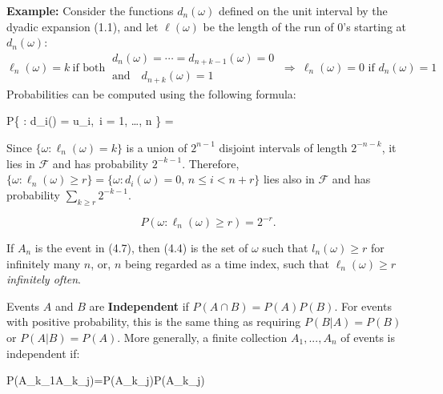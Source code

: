 \textbf{Example:} Consider the functions \( d_n(\omega) \) defined on the unit interval by the dyadic expansion (1.1), and let \( \boldsymbol{\ell}(\omega) \) be the length of the run of 0's starting at \( d_n(\omega) \):  
\[
\boldsymbol{\ell}_n(\omega) = k \ \text{if both} \ 
\begin{array}{l}
    d_n(\omega) = \cdots = d_{n+k-1}(\omega) = 0\\
    \text{and} \quad d_{n+k}(\omega) = 1
\end{array} \ \Rightarrow\  \boldsymbol{\ell}_n(\omega) = 0 \text{ if } d_n(\omega) = 1
\]  
Probabilities can be computed using the following formula:
\begin{UNequation}
    P\left\{ \omega : d_i(\omega) = u_i,\ i = 1, \ldots, n \right\} = 
\end{UNequation} 

Since $\{ \omega : \boldsymbol{\ell}_n(\omega) = k \}$ is a union of \( 2^{n-1} \) disjoint intervals of length \( 2^{-n-k} \), it lies in \( \mathcal{F} \) and has probability \( 2^{-k-1} \). Therefore,  \(\displaystyle \{ \omega : \boldsymbol{\ell}_n(\omega) \geq r \} = \{ \omega : d_i(\omega) = 0,\, n \leq i < n + r \}\)  
lies also in \( \mathcal{F} \) and has probability $\sum_{k \geq r} 2^{-k-1}$.

\begin{equation}
P\left( \omega : \boldsymbol{\ell}_n(\omega) \geq r \right) = 2^{-r}.
\tag{4.7}
\end{equation}

If \( A_n \) is the event in (4.7), then (4.4) is the set of \( \omega \) such that \( l_n(\omega) \geq r \) for infinitely many \( n \), or, \( n \) being regarded as a time index, such that \( \boldsymbol{\ell}_n(\omega) \geq r \) \textit{infinitely often}.

 \quad

Events $A$ and $B$ are \textbf{Independent} if $P(A\cap B)=P(A)P(B)$. For events with positive probability, this is the same thing as requiring $P(B|A)=P(B)$ or $P(A|B)=P(A)$. More generally, a finite collection $A_1,...,A_n$ of events is independent if:
\begin{UNequation}
    P(A_{k_1}\cap\cdots \cap A_{k_j})=P(A_{k_j})\cdots P(A_{k_j})
\end{UNequation}

